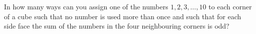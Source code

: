 In how many ways can you assign one of the numbers $1,2,3,\ldots,10$ to each corner of a cube
such that no number is used more than once and such that for each side face the sum of
the numbers in the four neighbouring corners is odd?